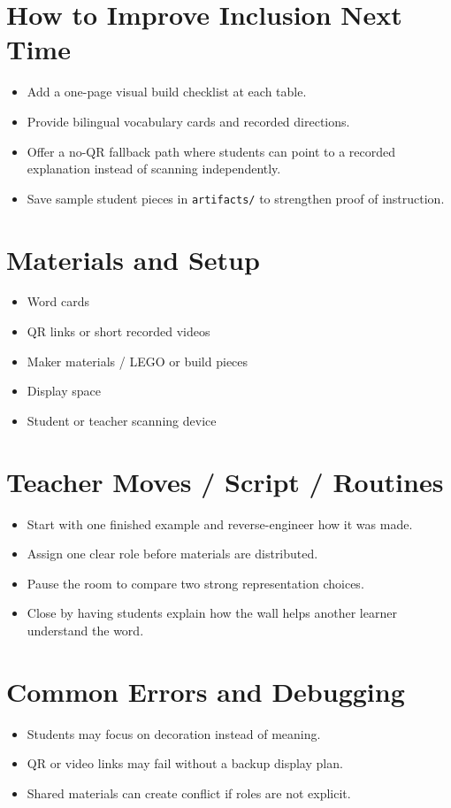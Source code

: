 \documentclass[11pt]{article}
\begin{document}
\section*{How to Improve Inclusion Next Time}
\begin{itemize}[leftmargin=*]
\item Add a one-page visual build checklist at each table.
\item Provide bilingual vocabulary cards and recorded directions.
\item Offer a no-QR fallback path where students can point to a recorded explanation instead of scanning independently.
\item Save sample student pieces in \texttt{artifacts/} to strengthen proof of instruction.
\end{itemize}

\section*{Materials and Setup}
\begin{itemize}[leftmargin=*]
\item Word cards
\item QR links or short recorded videos
\item Maker materials / LEGO or build pieces
\item Display space
\item Student or teacher scanning device
\end{itemize}

\section*{Teacher Moves / Script / Routines}
\begin{itemize}[leftmargin=*]
\item Start with one finished example and reverse-engineer how it was made.
\item Assign one clear role before materials are distributed.
\item Pause the room to compare two strong representation choices.
\item Close by having students explain how the wall helps another learner understand the word.
\end{itemize}

\section*{Common Errors and Debugging}
\begin{itemize}[leftmargin=*]
\item Students may focus on decoration instead of meaning.
\item QR or video links may fail without a backup display plan.
\item Shared materials can create conflict if roles are not explicit.
\end{itemize}
\end{document}
